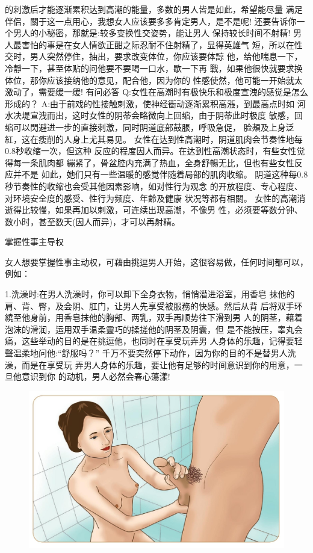\documentclass[12pt,UTF8]{ctexbook}
\begin{document}
的刺激后才能逐渐累积达到高潮的能量，多数的男人皆是如此，希望能尽量
满足伴侣，關于这一点用心，我想女人应该要多多肯定男人，是不是呢!
还要告诉你一个男人的小秘密，那就是:较多变换性交姿势，能让男人
保持较长时间不射精!
男人最害怕的事是在女人情欲正酣之际忍耐不住射精了，显得英雄气
短，所以在性交时，男人突然停住，抽出，要求改变体位，你应该要体諒
他，给他喘息一下，冷靜一下，甚至体贴的问他要不要喝一口水，歇一下再
戰，如果他很快就要求换体位，那你应该接纳他的意见，配合他，因为你的
性感使然，他可能一开始就太激动了，需要缓一缓!
有问必答
Q:女性在高潮时有极快乐和极度宣洩的感觉是怎么形成的？
A:由于前戏的性接触刺激，使神经衝动逐渐累积高漲，到最高点时如
河水决堤宣洩而出，这时女性的阴蒂会略微向上回缩，由于阴蒂此时极度
敏感，回缩可以閃避进一步的直接刺激，同时阴道底部鼓脹，呼吸急促，
脸頰及上身泛紅，这在瘦削的人身上尤其易见。
女性在达到性高潮时，阴道肌肉会节奏性地每0.8秒收缩一次，但这种
反应的程度因人而异。在达到性高潮状态时，有些女性觉得每一条肌肉都
繃紧了，骨盆腔内充满了热血，全身舒暢无比，但也有些女性反应并不是
如此，她们只有一些温暖的感觉伴随着局部的肌肉收缩。
阴道这种每0.8秒节奏性的收缩也会受其他因素影响，如对性行为观念
的开放程度、专心程度、对环境安全度的感受、性行为频度、年齡及健康
状况等都有相關。
女性的高潮消逝得比较慢，如果再加以刺激，可连续出现高潮，不像男
性，必须要等数分钟、数小时，甚至数天(因人而异)，才可以再射精。

掌握性事主导权

女人想要掌握性事主动权，可藉由挑逗男人开始，这很容易做，任何时间都可以，例如：

1.洗澡时:在男人洗澡时，你可以卸下全身衣物，悄悄潜进浴室，用香皂
抹他的肩、背、臀，及会阴、肛门，让男人先享受被服務的快感。然后从背
后将双手环繞至他身前，用香皂抹他的胸部、两乳，双手再顺势往下滑到男
人的阴茎，藉着泡沫的滑润，运用双手温柔靈巧的揉搓他的阴茎及阴囊，但
是不能按压，睾丸会痛，这些举动的目的是在挑逗他，也同时在享受玩弄男
人身体的乐趣，记得要轻聲温柔地问他:“舒服吗？”
千万不要突然停下动作，因为你的目的不是替男人洗澡，而是在享受玩
弄男人身体的乐趣，要让他有足够的时间意识到你的用意，一旦他意识到你
的动机，男人必然会春心蕩漾!

\begin{figure}[htbp]
	\centering
	\includegraphics[width=0.7\linewidth]{14}
	\caption{}
	\label{fig:1}
\end{figure}
\end{document}
